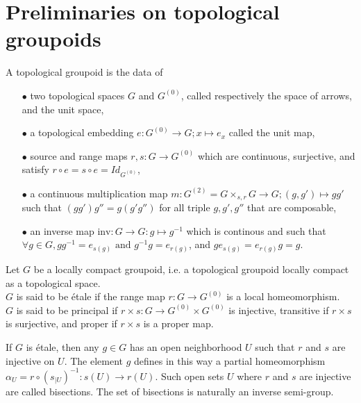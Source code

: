 \section{Preliminaries on topological groupoids}

\begin{definition}
A topological groupoid is the data of 
\begin{itemize}
\item[$\bullet$] two topological spaces $G$ and $G^{(0)}$, called respectively the space of arrows, and the unit space,
\item[$\bullet$] a topological embedding $e: G^{(0)}\rightarrow G; x\mapsto e_x$ called the unit map,
\item[$\bullet$] source and range maps $r,s : G\rightarrow G^{(0)}$ which are continuous, surjective, and satisfy $r\circ e = s\circ e = Id_{G^{(0)}}$,
\item[$\bullet$] a continuous multiplication map $m : G^{(2)}=G\times_{s,r}G\rightarrow G; (g,g')\mapsto gg'$ such that $(gg')g''=g(g'g'')$ for all triple $g,g',g''$ that are composable,
\item[$\bullet$] an inverse map $\text{inv} : G\rightarrow G: g\mapsto g^{-1}$ which is continous and such that $\forall g\in G, gg^{-1}=e_{s(g)} \text{ and }g^{-1}g=e_{r(g)}$, and $g e_{s(g)} = e_{r(g)} g =g$.
\end{itemize} 
\end{definition}

\begin{definition}
Let $G$ be a locally compact groupoid, i.e. a topological groupoid locally compact as a topological space.\\
$G$ is said to be étale if the range map $r:G\rightarrow G^{(0)}$ is a local homeomorphism.\\
$G$ is said to be principal if $r\times s : G\rightarrow G^{(0)}\times G^{(0)}$ is injective, transitive if $r\times s $ is surjective, and proper if $r\times s $ is a proper map. 
\end{definition}

If $G$ is étale, then any $g\in G$ has an open neighborhood $U$ such that $r$ and $s$ are injective on $U$. The element $g$ defines in this way a partial homeomorphism $\alpha_U = r\circ (s_{|U})^{-1} : s(U)\rightarrow r(U)$. Such open sets $U$ where $r$ and $s$ are injective are called bisections. The set of bisections is naturally an inverse semi-group. \cite{paterson}\\

